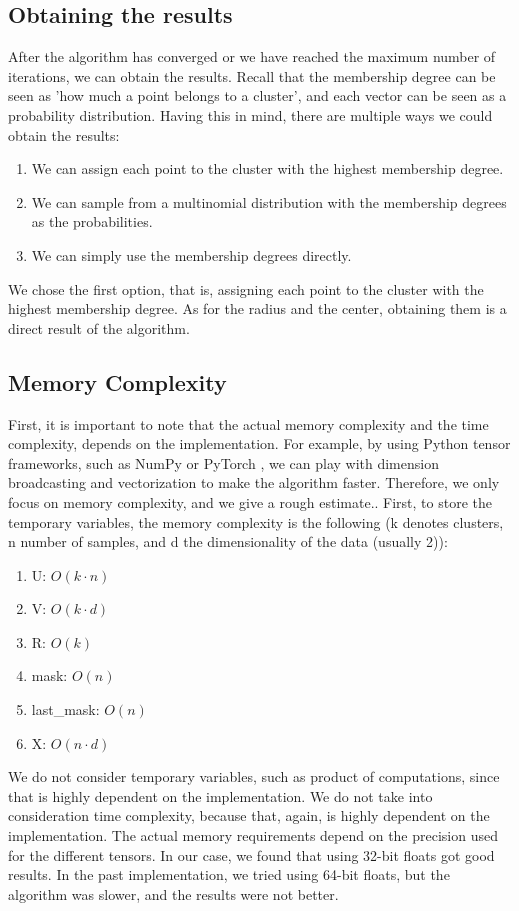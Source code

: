 \documentclass[conference]{IEEEtran}
\begin{document}
\subsection{Obtaining the results}
After the algorithm has converged or we have reached the maximum number of iterations, we can obtain the results.
Recall that the membership degree can be seen as 'how much a point belongs to a cluster', and each vector can be seen as a probability distribution.
Having this in mind, there are multiple ways we could obtain the results:
\begin{enumerate}
    \item We can assign each point to the cluster with the highest membership degree.
    \item We can sample from a multinomial distribution with the membership degrees as the probabilities.
    \item We can simply use the membership degrees directly.
\end{enumerate}
We chose the first option, that is, assigning each point to the cluster with the highest membership degree.
As for the radius and the center, obtaining them is a direct result of the algorithm.

\subsection{Memory Complexity}
First, it is important to note that the actual memory complexity and the time complexity, depends on the implementation. For example, by using Python tensor frameworks,
such as NumPy \cite{harris2020array} or PyTorch \cite{paszke2019pytorch}, we can play with dimension broadcasting and vectorization to make the algorithm faster.
Therefore, we only focus on memory complexity, and we give a rough estimate..
First, to store the temporary variables, the memory complexity is the following (k denotes clusters, n number of samples, and d the dimensionality of the data (usually 2)):
\begin{enumerate}
    \item U: $O(k \cdot n)$
    \item V: $O(k \cdot d)$
    \item R: $O(k)$
    \item mask: $O(n)$
    \item last\_mask: $O(n)$
    \item X: $O(n \cdot d)$
\end{enumerate}
We do not consider temporary variables, such as product of computations, since that is highly dependent on the implementation.
We do not take into consideration time complexity, because that, again, is highly dependent on the implementation.
The actual memory requirements depend on the precision used for the different tensors. In our case, we found that using 32-bit floats got good results.
In the past implementation, we tried using 64-bit floats, but the algorithm was slower, and the results were not better.
\end{document}
